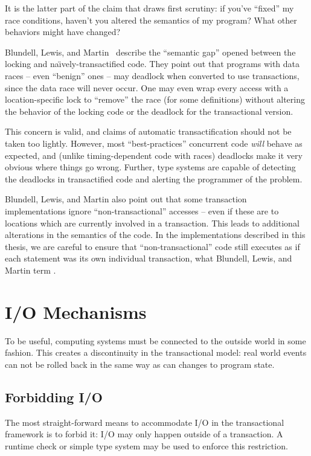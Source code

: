 It is the latter part of the claim that draws first scrutiny: if
you've ``fixed'' my race conditions, haven't you altered the semantics
of my program?  What other behaviors might have changed?

Blundell, Lewis, and Martin~\cite{BlundellLeMa05} describe the
``semantic gap'' opened between the locking and
na{\"\i}vely-transactified code.  They point out that programs with
data races -- even ``benign'' ones -- may deadlock when converted to
use transactions, since the data race will never occur.  One may even
wrap every access with a location-specific lock to ``remove'' the race
(for some definitions) without altering the behavior of the locking
code or the deadlock for the transactional version.

This concern is valid, and claims of automatic transactification
should not be taken too lightly.  However, most ``best-practices''
concurrent code \emph{will} behave as expected, and (unlike
timing-dependent code with races) deadlocks make it very obvious where
things go wrong.  Further, type systems are capable of detecting the
deadlocks in transactified code and alerting
the programmer of the problem.

Blundell, Lewis, and Martin also point out that some transaction
implementations ignore ``non-transactional'' accesses -- even if these
are to locations which are currently involved in a transaction.  This
leads to additional alterations in the semantics of the code.  In the
implementations described in this thesis, we are careful to ensure
that ``non-transactional'' code still executes as if each statement
was its own individual transaction, what Blundell, Lewis, and Martin
term .

\section{I/O Mechanisms}\label{sec:io}
To be useful, computing systems must be connected to the outside world
in some fashion.  This creates a discontinuity in the transactional model:
real world events can not be rolled back in the same way as can changes
to program state.

\subsection{Forbidding I/O}
The most straight-forward means to accommodate I/O in the
transactional framework is to forbid it: I/O may only happen outside
of a transaction.  A runtime check or simple type system may be used
to enforce this restriction.

